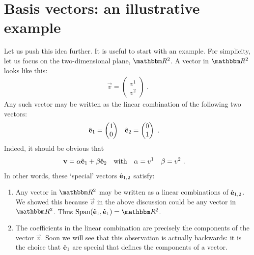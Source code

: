 \documentclass[12pt, oneside]{report}    %
\let\oldsection\section
\def\section{%
  \setcounter{sidenote}{1}%
  \oldsection
}
\begin{document}
\section{Basis vectors: an illustrative example}

Let us push this idea further. It is useful to start with an example. For simplicity, let us focus on the two-dimensional plane, $\RR ^2$. A vector in $\RR ^2$ looks like this:
\begin{align}
    \vec{v} =
    \begin{pmatrix}
        v^1 \\ v^2
    \end{pmatrix} \ .
    \label{eq:v:v1:v2}
\end{align}
Any such vector may be written as the linear combination of the following two vectors:
\begin{align}
    {\hat{\mathbf{e}}}_1 &=
    \begin{pmatrix}
        1 \\ 0
    \end{pmatrix}
    &
    {\hat{\mathbf{e}}}_2 &=
    \begin{pmatrix}
        0 \\ 1
    \end{pmatrix} \ .
\end{align}
Indeed, it should be obvious that 
\begin{align}
    \mathbf{v} &= \alpha {\hat{\mathbf{e}}}_1 + \beta {\hat{\mathbf{e}}}_2
    & \textnormal{with}&
    &\alpha &= v^1
    &\beta &= v^2 \ .
    \label{eq:natural:cartesian:basis}
\end{align}
In other words, these `special' vectors ${\hat{\mathbf{e}}}_{1,2}$ satisfy:
\begin{enumerate}
    \item Any vector in $\RR ^2$ may be written as a linear combinations of ${\hat{\mathbf{e}}}_{1,2}$. We showed this because $\vec{v}$ in the above discussion could be any vector in $\RR ^2$. Thus $\text{Span}({\bas{e}}_{1},{\bas{e}}_{1})=\RR ^2$.
    \item The coefficients in the linear combination are precisely the components of the vector $\vec{v}$. Soon we will see that this observation is actually backwards: it is the choice that ${\hat{\mathbf{e}}}_{1}$ are special that defines the components of a vector.
\end{enumerate}
\end{document}
